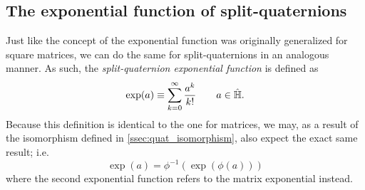 \subsection{The exponential function of split-quaternions}
\label{ssec:exponential}
Just like the concept of the exponential function was originally generalized for square matrices, we can do the same for split-quaternions in an analogous manner. As such, the \emph{split-quaternion exponential function} is defined as
\begin{equation}
     \exp(a) \equiv \sum_{k=0}^\infty \frac{a^k}{k!} \qquad a \in \hat{\mathbb{H}}.
\end{equation}
Because this definition is identical to the one for matrices, we may, as a result of the isomorphism defined in \cref{ssec:quat_isomorphism}, also expect the exact same result; i.e.
\begin{equation}
     \exp(a) = \phi^{-1}(\exp(\phi(a)))
\end{equation}
where the second exponential function refers to the matrix exponential instead.


